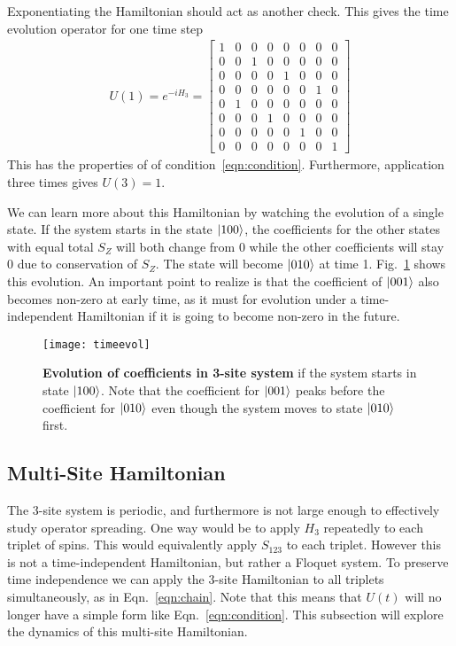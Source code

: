 Exponentiating the Hamiltonian should act as another check. This gives the time evolution operator for one time step
\begin{align}
U(1) = e^{-iH_3} = \begin{bmatrix}
1 & 0 & 0 & 0 & 0 & 0 & 0 & 0 \\
0 & 0 & 1 & 0 & 0 & 0 & 0 & 0 \\
0 & 0 & 0 & 0 & 1 & 0 & 0 & 0 \\
0 & 0 & 0 & 0 & 0 & 0 & 1 & 0 \\
0 & 1 & 0 & 0 & 0 & 0 & 0 & 0 \\
0 & 0 & 0 & 1 & 0 & 0 & 0 & 0 \\
0 & 0 & 0 & 0 & 0 & 1 & 0 & 0 \\
0 & 0 & 0 & 0 & 0 & 0 & 0 & 1
\end{bmatrix}
\end{align}
This has the properties of of condition~\ref{eqn:condition}. Furthermore, application three times gives $U(3) = 1$. 

We can learn more about this Hamiltonian by watching the evolution of a single state. If the system starts in the state $\left|100\right\rangle$, the coefficients for the other states with equal total $S_Z$ will both change from 0 while the other coefficients will stay 0 due to conservation of $S_Z$.
The state will become $\left|010\right\rangle$ at time 1. Fig.~\ref{fig:timeevol} shows this evolution. An important point to realize is that the coefficient of $\left|001\right\rangle$ also becomes non-zero at early time, as it must for evolution under a time-independent Hamiltonian if it is going to become non-zero in the future. 
\begin{figure}
	\centering
	\texttt{[image: timeevol]}
	\caption{\textbf{Evolution of coefficients in 3-site system} if the system starts in state $\left|100\right\rangle$. Note that the coefficient for $\left|001\right\rangle$ peaks before the coefficient for $\left|010\right\rangle$ even though the system moves to state $\left|010\right\rangle$ first.}
	\label{fig:timeevol}
\end{figure}

\subsection{Multi-Site Hamiltonian} \label{sub:multistate}

The 3-site system is periodic, and furthermore is not large enough to effectively study operator spreading. One way would be to apply $H_3$ repeatedly to each triplet of spins. This would equivalently apply $S_{123}$ to each triplet. However this is not a time-independent Hamiltonian, but rather a Floquet system. To preserve time independence we can apply the 3-site Hamiltonian to all triplets simultaneously, as in Eqn.~\ref{eqn:chain}. Note that this means that $U(t)$ will no longer have a simple form like Eqn.~\ref{eqn:condition}. This subsection will explore the dynamics of this multi-site Hamiltonian.

